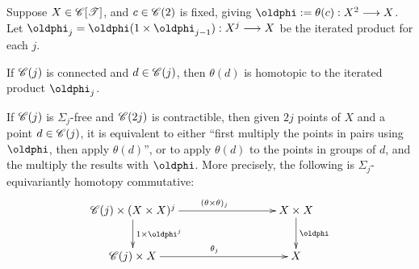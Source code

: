 \documentclass[11pt]{article}
\begin{document}
\begin{lem*}[1.9]
Suppose $X\in\mathscr{C}[\mathscr{T}]$, and $c\in\mathscr{C}(2)$ is fixed, giving 
$\oldphi:=\theta(c):X^2\to X$. Let 
$\oldphi_j=\oldphi(1\times \oldphi_{j-1}):X^j\to X$ be the iterated product 
for each $j$.
\begin{itemise}
\item If $\mathscr{C}(j)$ is connected and $d\in\mathscr{C}(j)$, then $\theta(d)$ is 
homotopic to the iterated product $\oldphi_j$.
\item If $\mathscr{C}(j)$ is $\Sigma_j$-free and $\mathscr{C}(2j)$ is contractible, then given
$2j$ points of $X$ and a point $d\in\mathscr{C}(j)$, it is equivalent to either ``first
multiply the points in pairs using $\oldphi$, then apply $\theta(d)$'', or to apply 
$\theta(d)$ to the points in groups of $d$, and the multiply the results with
$\oldphi$. More precisely, the following is $\Sigma_j$-equivariantly homotopy
commutative:
\[\xymatrix@C=3cm{\scrC(j)\times(X\times X)^j
\ar[r]^{(\theta\times\theta)_j}\ar[d]^{1\times\oldphi^j}&X\times X\ar[d]^\oldphi\\
\scrC(j)\times X\ar[r]^{\theta_j}&X
}\]
\end{itemise}
\end{lem*}
\end{document}
